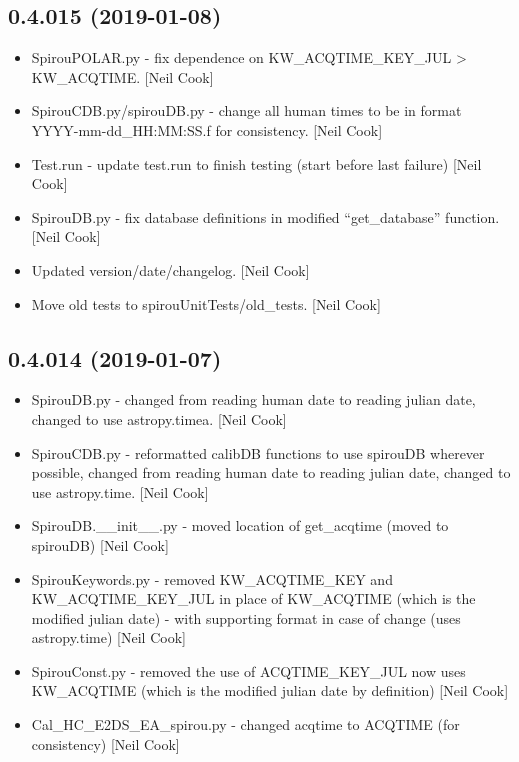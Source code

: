 \documentclass[a4paper,10pt,english]{report}
\begin{document}
\subsection{0.4.015 (2019-01-08)}
\label{\detokenize{misc/changelog:id220}}\begin{itemize}
\item {} 
SpirouPOLAR.py - fix dependence on KW\_ACQTIME\_KEY\_JUL \textendash{}\textgreater{} KW\_ACQTIME.
{[}Neil Cook{]}

\item {} 
SpirouCDB.py/spirouDB.py - change all human times to be in format
YYYY-mm-dd\_HH:MM:SS.f for consistency. {[}Neil Cook{]}

\item {} 
Test.run - update test.run to finish testing (start before last
failure) {[}Neil Cook{]}

\item {} 
SpirouDB.py - fix database definitions in modified “get\_database”
function. {[}Neil Cook{]}

\item {} 
Updated version/date/changelog. {[}Neil Cook{]}

\item {} 
Move old tests to spirouUnitTests/old\_tests. {[}Neil Cook{]}

\end{itemize}


\subsection{0.4.014 (2019-01-07)}
\label{\detokenize{misc/changelog:id221}}\begin{itemize}
\item {} 
SpirouDB.py - changed from reading human date to reading julian date,
changed to use astropy.timea. {[}Neil Cook{]}

\item {} 
SpirouCDB.py - reformatted calibDB functions to use spirouDB wherever
possible, changed from reading human date to reading julian date,
changed to use astropy.time. {[}Neil Cook{]}

\item {} 
SpirouDB.\_\_init\_\_.py - moved location of get\_acqtime (moved to
spirouDB) {[}Neil Cook{]}

\item {} 
SpirouKeywords.py - removed KW\_ACQTIME\_KEY and KW\_ACQTIME\_KEY\_JUL in
place of KW\_ACQTIME (which is the modified julian date) - with
supporting format in case of change (uses astropy.time) {[}Neil Cook{]}

\item {} 
SpirouConst.py - removed the use of ACQTIME\_KEY\_JUL now uses
KW\_ACQTIME (which is the modified julian date by definition) {[}Neil
Cook{]}

\item {} 
Cal\_HC\_E2DS\_EA\_spirou.py - changed acqtime to ACQTIME (for
consistency) {[}Neil Cook{]}

\end{itemize}
\end{document}
